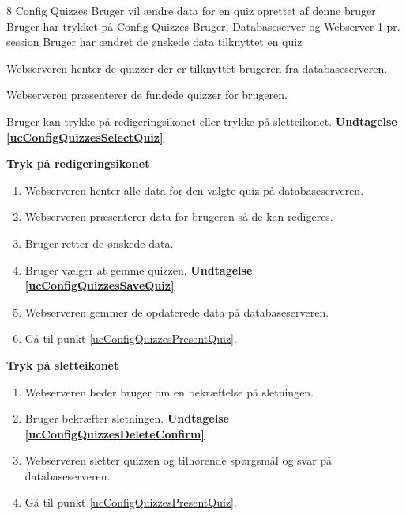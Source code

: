 \uchead
	{8} %
	{Config Quizzes} %
	{Bruger vil ændre data for en quiz oprettet af denne bruger} %
	{Bruger har trykket på Config Quizzes} %
	{Bruger, Databaseserver og Webserver} %
	{} %
	{1 pr. session} %
	{Bruger har ændret de ønskede data tilknyttet en quiz} %


\item\label{ucConfigQuizzesPresentQuiz} Webserveren henter de quizzer der er tilknyttet brugeren fra databaseserveren.

\item Webserveren præsenterer de fundede quizzer for brugeren.

\item\label{ucConfigQuizzesSelectQuiz} Bruger kan trykke på redigeringsikonet eller trykke på sletteikonet. \textbf{Undtagelse \ref{ucConfigQuizzesSelectQuiz}}

\textbf{Tryk på redigeringsikonet}

	\begin{enumerate}
		\item Webserveren henter alle data for den valgte quiz på databaseserveren.
		
		\item Webserveren præsenterer data for brugeren så de kan redigeres.
		
		\item Bruger retter de ønskede data.
		
		\item\label{ucConfigQuizzesSaveQuiz} Bruger vælger at gemme quizzen. \textbf{Undtagelse \ref{ucConfigQuizzesSaveQuiz}}
		
		\item Webserveren gemmer de opdaterede data på databaseserveren.
		
		\item Gå til punkt \ref{ucConfigQuizzesPresentQuiz}.
		
	\end{enumerate}

\textbf{Tryk på sletteikonet}
	
	\begin{enumerate}
		\item Webserveren beder bruger om en bekræftelse på sletningen.
		
		\item\label{ucConfigQuizzesDeleteConfirm} Bruger bekræfter sletningen. \textbf{Undtagelse \ref{ucConfigQuizzesDeleteConfirm}}
		
		\item Webserveren sletter quizzen og tilhørende spørgsmål og svar på databaseserveren.
		
		\item Gå til punkt \ref{ucConfigQuizzesPresentQuiz}.
		
	\end{enumerate}

